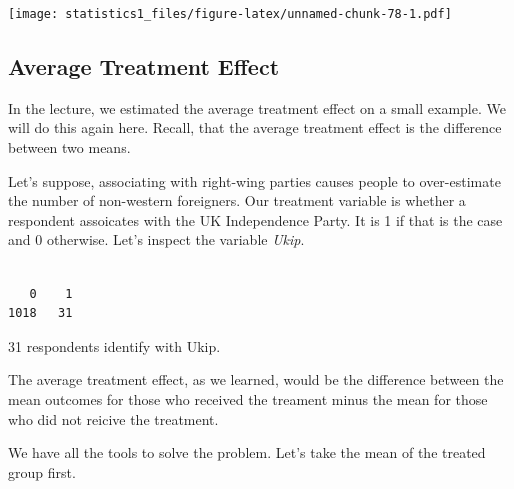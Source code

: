 \documentclass[]{book}
\newenvironment{Shaded}{\begin{snugshade}}{\end{snugshade}}
\newcommand{\KeywordTok}[1]{\textcolor[rgb]{0.13,0.29,0.53}{\textbf{#1}}}
\newcommand{\DataTypeTok}[1]{\textcolor[rgb]{0.13,0.29,0.53}{#1}}
\newcommand{\DecValTok}[1]{\textcolor[rgb]{0.00,0.00,0.81}{#1}}
\newcommand{\StringTok}[1]{\textcolor[rgb]{0.31,0.60,0.02}{#1}}
\newcommand{\OperatorTok}[1]{\textcolor[rgb]{0.81,0.36,0.00}{\textbf{#1}}}
\newcommand{\NormalTok}[1]{#1}
\theoremstyle{definition}
\theoremstyle{definition}
\theoremstyle{definition}
\theoremstyle{remark}
\begin{document}
\begin{Shaded}
\end{Shaded}

\texttt{[image: statistics1\_files/figure-latex/unnamed-chunk-78-1.pdf]}

\subsection{Average Treatment Effect}\label{average-treatment-effect}

In the lecture, we estimated the average treatment effect on a small
example. We will do this again here. Recall, that the average treatment
effect is the difference between two means.

Let's suppose, associating with right-wing parties causes people to
over-estimate the number of non-western foreigners. Our treatment
variable is whether a respondent assoicates with the UK Independence
Party. It is 1 if that is the case and 0 otherwise. Let's inspect the
variable \emph{Ukip}.

\begin{Shaded}
\end{Shaded}

\begin{verbatim}

   0    1 
1018   31 
\end{verbatim}

31 respondents identify with Ukip.

The average treatment effect, as we learned, would be the difference
between the mean outcomes for those who received the treament minus the
mean for those who did not reicive the treatment.

We have all the tools to solve the problem. Let's take the mean of the
treated group first.

\begin{Shaded}
\end{Shaded}
\end{document}
